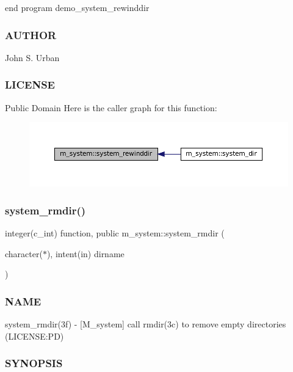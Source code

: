 end program demo\+\_\+system\+\_\+rewinddir \subsubsection*{A\+U\+T\+H\+OR}

John S. Urban \subsubsection*{L\+I\+C\+E\+N\+SE}

Public Domain Here is the caller graph for this function\+:\nopagebreak
\begin{figure}[H]
\begin{center}
\leavevmode
\includegraphics[width=350pt]{namespacem__system_a3ffe757195ade8052e8acabd196ee3ca_icgraph}
\end{center}
\end{figure}
\mbox{\label{namespacem__system_a21fd3e1ccd50cef6adc539ef3d7a9836}} 
\subsubsection{\texorpdfstring{system\+\_\+rmdir()}{system\_rmdir()}}
{\footnotesize\ttfamily integer(c\+\_\+int) function, public m\+\_\+system\+::system\+\_\+rmdir (\begin{DoxyParamCaption}\item[{character($\ast$), intent(in)}]{dirname }\end{DoxyParamCaption})}



\subsubsection*{N\+A\+ME}

system\+\_\+rmdir(3f) -\/ \mbox{[}M\+\_\+system\mbox{]} call rmdir(3c) to remove empty directories (L\+I\+C\+E\+N\+SE\+:PD) 

\subsubsection*{S\+Y\+N\+O\+P\+S\+IS}


